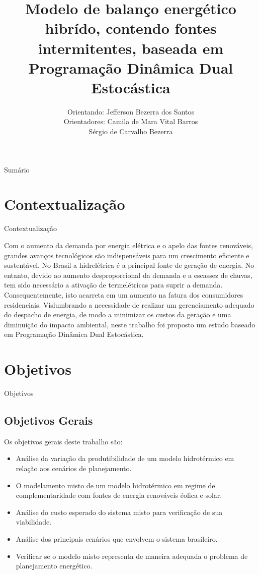 \documentclass[12pt]{beamer}%
\title{Modelo de balan\c co energ\'etico hibr\'ido, contendo fontes intermitentes, baseada em  Programa\c{c}\~{a}o Din\^{a}mica Dual Estoc\'{a}stica}%
\author[]{\textrm{\scriptsize Orientando: Jefferson Bezerra dos Santos\\ Orientadores: Camila de Mara Vital Barros \\
\hspace{2.2cm}S\'ergio de Carvalho Bezerra}}
\institute{Universidade Federal da Para\'iba }
\date{}
\begin{document}
\begin{frame}
\titlepage %
\end{frame}

\begin{frame}{Sum\'ario}
	\tableofcontents
\end{frame}

\section{Contextualiza\c c\~ao}
\begin{frame}{Contextualiza\c c\~ao}
	\begin{justify}	
	  Com o aumento da demanda por energia el\'etrica e o apelo das fontes renov\'aveis, grandes avan\c cos tecnol\'ogicos
	  s\~ao indispens\'aveis para um crescimento eficiente e sustent\'avel. No Brasil a hidrel\'etrica \'e a principal fonte
	  de gera\c c\~ao de energia. No entanto, devido ao aumento desproporcional da demanda e a escassez de chuvas,
	  tem sido necess\'ario a ativa\c c\~ao de termel\'etricas para suprir a demanda. Consequentemente, isto acarreta em um aumento na fatura
	  dos consumidores residenciais. Vislumbrando a necessidade de realizar um gerenciamento adequado do despacho de energia, de modo a minimizar os custos da gera\c c\~ao e uma diminui\c c\~ao do impacto ambiental, neste trabalho foi proposto um estudo baseado em Programa\c c\~ao
	  Din\^amica Dual Estoc\'astica.
	\end{justify}
\end{frame}

\section{Objetivos}
\begin{frame}{Objetivos}
\subsection{Objetivos Gerais}
Os objetivos gerais deste trabalho s\~ao:
\begin{itemize}
		\justifying
	\item An\'alise da varia\c c\~ao da produtibilidade de um modelo hidrot\'ermico em rela\c c\~ao aos cen\'arios de
		planejamento. 
	\item O modelamento misto de um modelo hidrot\'ermico em regime de complementaridade com fontes de energia renov\'aveis \'eolica e solar.
	\item An\'alise do custo esperado do sistema misto para verifica\c c\~ao de sua viabilidade.
	\item An\'alise dos principais cen\'arios que envolvem o sistema brasileiro. 
	\item Verificar se o modelo misto representa de maneira adequada o problema de planejamento energ\'etico.
\end{itemize}
\end{frame}
\end{document}
